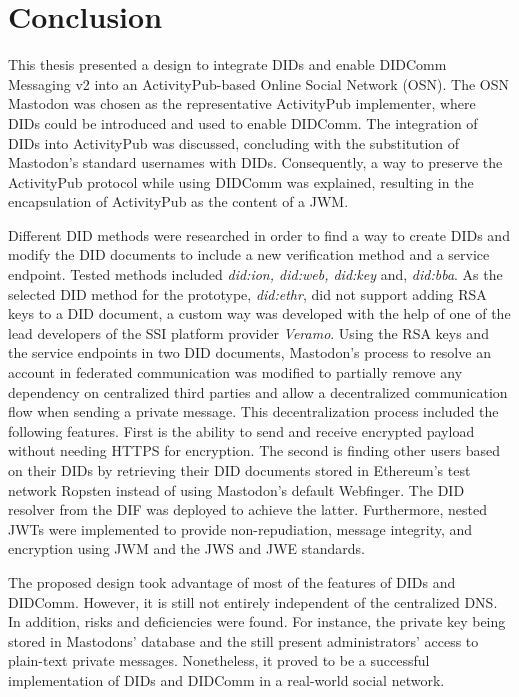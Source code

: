 \chapter{Conclusion}
\label{cha:conclusion}

This thesis presented a design to integrate DIDs and enable DIDComm Messaging v2 into an ActivityPub-based Online Social Network (OSN). The OSN Mastodon was chosen as the representative ActivityPub implementer, where DIDs could be introduced and used to enable DIDComm. 
 The integration of DIDs into ActivityPub was discussed, concluding with the substitution of Mastodon's standard usernames with DIDs. Consequently, a way to preserve the ActivityPub protocol while using DIDComm was explained, resulting in the encapsulation of ActivityPub as the content of a JWM.

Different DID methods were researched in order to find a way to create DIDs and modify the DID documents to include a new verification method and a service endpoint. Tested methods included \emph{did:ion, did:web, did:key} and, \emph{did:bba}. As the selected DID method for the prototype, \emph{did:ethr}, did not support adding RSA keys to a DID document, a custom way was developed with the help of one of the lead developers of the SSI platform provider \emph{Veramo}.
Using the RSA keys and the service endpoints in two DID documents, Mastodon's process to resolve an account in federated communication was modified to partially remove any dependency on centralized third parties and allow a decentralized communication flow when sending a private message. This decentralization process included the following features. First is the ability to send and receive encrypted payload without needing HTTPS for encryption. The second is finding other users based on their DIDs by retrieving their DID documents stored in Ethereum's test network Ropsten instead of using Mastodon's default Webfinger. The DID resolver from the DIF was deployed to achieve the latter. Furthermore, nested JWTs were implemented to provide non-repudiation, message integrity, and encryption using JWM and the JWS and JWE standards.

The proposed design took advantage of most of the features of DIDs and DIDComm. However, it is still not entirely independent of the centralized DNS. In addition, risks and deficiencies were found. For instance, the private key being stored in Mastodons' database and the still present administrators' access to plain-text private messages. Nonetheless, it proved to be a successful implementation of DIDs and DIDComm in a real-world social network. 


